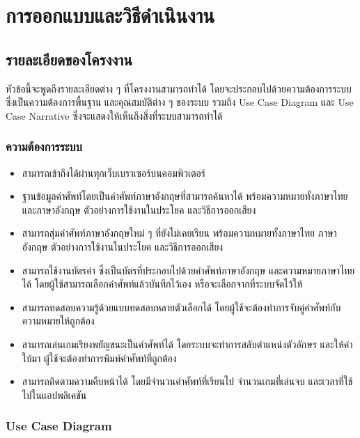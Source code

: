 \documentclass[12pt,oneside,openright,a4paper]{cpe-thai-project}
\begin{document}

\chapter{การออกแบบและวิธีดำเนินงาน}

\section{รายละเอียดของโครงงาน}
\hspace{1cm}
หัวข้อนี้จะพูดถึงรายละเอียดต่าง ๆ ที่โครงงานสามารถทำได้ โดยจะประกอบไปด้วยความต้องการระบบ
ซึ่งเป็นความต้องการพื้นฐาน และคุณสมบัติต่าง ๆ ของระบบ รวมถึง Use Case Diagram
และ Use Case Narrative ซึ่งจะแสดงให้เห็นถึงสิ่งที่ระบบสามารถทำได้

\subsection{ความต้องการระบบ}
\begin{itemize}
	\item สามารถเข้าถึงได้ผ่านทุกเว็บเบราเซอร์บนคอมพิวเตอร์
	\item ฐานข้อมูลคำศัพท์โดยเป็นคำศัพท์ภาษาอังกฤษที่สามารถค้นหาได้ พร้อมความหมายทั้งภาษาไทยและภาษาอังกฤษ ตัวอย่างการใช้งานในประโยค และวิธีการออกเสียง
	\item สามารถสุ่มคำศัพท์ภาษาอังกฤษใหม่ ๆ ที่ยังไม่เคยเรียน พร้อมความหมายทั้งภาษาไทย ภาษาอังกฤษ ตัวอย่างการใช้งานในประโยค และวิธีการออกเสียง
	\item สามารถใช้งานบัตรคำ ซึ่งเป็นบัตรที่ประกอบไปด้วยคำศัพท์ภาษาอังกฤษ และความหมายภาษาไทยได้ โดยผู้ใช้สามารถเลือกคำศัพท์แล้วบันทึกไว้เอง หรือจะเลือกจากที่ระบบจัดไว้ให้
	\item สามารถทดสอบความรู้ด้วยแบบทดสอบหลายตัวเลือกได้ โดยผู้ใช้จะต้องทำการจับคู่คำศัพท์กับความหมายให้ถูกต้อง
	\item สามารถเล่นเกมเรียงพยัญชนะเป็นคำศัพท์ได้ โดยระบบจะทำการสลับตำแหน่งตัวอักษร และให้คำใบ้มา ผู้ใช้จะต้องทำการพิมพ์คำศัพท์ที่ถูกต้อง
	\item สามารถติดตามความคืบหน้าได้ โดยมีจำนวนคำศัพท์ที่เรียนไป จำนวนเกมที่เล่นจบ และเวลาที่ใช้ไปในแอปพลิเคชัน
\end{itemize}

\pagebreak
\subsection{Use Case Diagram}
\end{document}
